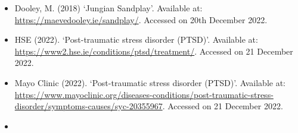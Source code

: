 \documentclass[
  10pt,
]{article}
\providecommand{\tightlist}{%
  \setlength{\itemsep}{0pt}\setlength{\parskip}{0pt}}
\begin{document}
\begin{itemize}
\tightlist
\item
  Dooley, M. (2018) `Jungian Sandplay'. Available at:
  \url{https://maevedooley.ie/sandplay/}. Accessed on 20th December
  2022.
\item
  HSE (2022). `Post-traumatic stress disorder (PTSD)'. Available at:
  \url{https://www2.hse.ie/conditions/ptsd/treatment/}. Accessed on 21
  December 2022.
\item
  Mayo Clinic (2022). `Post-traumatic stress disorder (PTSD)'. Available
  at:
  \url{https://www.mayoclinic.org/diseases-conditions/post-traumatic-stress-disorder/symptoms-causes/syc-20355967}.
  Accessed on 21 December 2022.
\item
\end{itemize}
\end{document}
